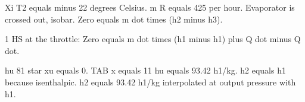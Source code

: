 Xi T2 equals minus 22 degrees Celsius.
m R equals 425 per hour.
Evaporator is crossed out, isobar.
Zero equals m dot times (h2 minus h3).

1 HS at the throttle:
Zero equals m dot times (h1 minus h1) plus Q dot minus Q dot.

hu 81 star xu equals 0.
TAB x equals 11 hu equals 93.42 h1/kg.
h2 equals h1 because isenthalpic.
h2 equals 93.42 h1/kg interpolated at output pressure with h1.